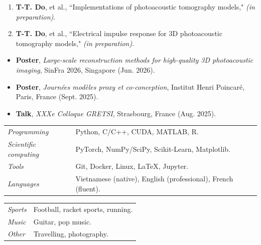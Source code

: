 \documentclass[a4paper,10pt]{article}
\begin{document}
\medskip
{}%
\begin{enumerate}[leftmargin=*, label=\arabic*.]
    \item \textbf{T-T. Do}, et al., ``Implementations of photoacoustic tomography models," \emph{(in preparation)}.
    \item \textbf{T-T. Do}, et al., ``Electrical impulse response for 3D photoacoustic tomography models," \emph{(in preparation)}.
\end{enumerate}

\medskip
{}
\begin{itemize}[leftmargin=*]
    \item \textbf{Poster}, \emph{Large-scale reconstruction methods for high-quality 3D photoacoustic imaging}, SinFra 2026, Singapore (Jun. 2026).
    \item \textbf{Poster}, \emph{Journées modèles proxy et co-conception}, Institut Henri Poincaré, Paris, France (Sept. 2025).
    \item \textbf{Talk}, \emph{XXXe Colloque GRETSI}, Strasbourg, France (Aug. 2025).
\end{itemize}


\bigskip
\begin{tabular}{p{4cm}p{12cm}}
    \emph{Programming} & Python, C/C++, CUDA, MATLAB, R. \\
    \emph{Scientific computing} & PyTorch, NumPy/SciPy, Scikit-Learn, Matplotlib. \\
    \emph{Tools} & Git, Docker, Linux, \LaTeX, Jupyter. \\
    \emph{Languages} & Vietnamese (native), English (professional), French (fluent). \\
\end{tabular}

\bigskip
\noindent
\begin{tabular}{p{3cm}p{15cm}}
    \emph{Sports} & Football, racket sports, running. \\
    \emph{Music}  & Guitar, pop music. \\
    \emph{Other}  & Travelling, photography.
\end{tabular}
\end{document}
